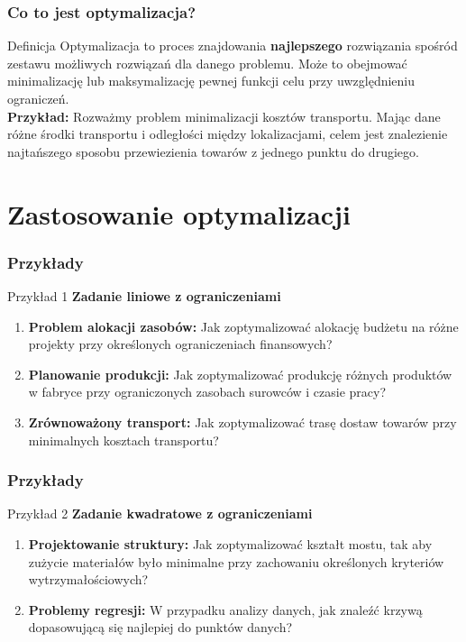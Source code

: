 \documentclass{beamer}
\begin{document}
\begin{frame}
    \frametitle{Co to jest optymalizacja?}
    \begin{block}{Definicja}
    Optymalizacja to proces znajdowania \textbf{najlepszego} rozwiązania spośród zestawu możliwych rozwiązań dla danego problemu. Może to obejmować minimalizację lub maksymalizację pewnej funkcji celu przy uwzględnieniu ograniczeń. \\
    \textbf{Przykład:} Rozważmy problem minimalizacji kosztów transportu. Mając dane różne środki transportu i odległości między lokalizacjami, celem jest znalezienie najtańszego sposobu przewiezienia towarów z jednego punktu do drugiego.
    \end{block}
\end{frame}

\section{Zastosowanie optymalizacji}
\begin{frame}
    \frametitle{Przykłady}
    \begin{block}{Przykład 1}
    \textbf{Zadanie liniowe z ograniczeniami} 
        \begin{enumerate}
            \item \textbf{Problem alokacji zasobów:} Jak zoptymalizować alokację budżetu na różne projekty przy określonych ograniczeniach finansowych?
            \item \textbf{Planowanie produkcji:} Jak zoptymalizować produkcję różnych produktów w fabryce przy ograniczonych zasobach surowców i czasie pracy?
            \item \textbf{Zrównoważony transport:} Jak zoptymalizować trasę dostaw towarów przy minimalnych kosztach transportu?
        \end{enumerate}
    \end{block}
\end{frame}

\begin{frame}
    \frametitle{Przykłady}
    \begin{block}{Przykład 2}
    \textbf{Zadanie kwadratowe z ograniczeniami} 
        \begin{enumerate}
            \item \textbf{Projektowanie struktury:} Jak zoptymalizować kształt mostu, tak aby zużycie materiałów było minimalne przy zachowaniu określonych kryteriów wytrzymałościowych?
            \item \textbf{Problemy regresji:} W przypadku analizy danych, jak znaleźć krzywą dopasowującą się najlepiej do punktów danych?
        \end{enumerate}
    \end{block}
\end{frame}
\end{document}
